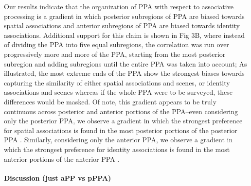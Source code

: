 \documentclass[english]{article}
\begin{document}
%
Our results indicate that the organization of PPA with respect to associative
processing is a gradient in which posterior subregions of PPA are biased towards
spatial associations and anterior subregions of PPA are biased towards identity
associations\citep{aminoff2015associative}.
%
Additional support for this claim is shown in Fig 3B, where instead of dividing
the PPA into five equal subregions, the correlation was run over progressively
more and more of the PPA, starting from the most posterior subregion and adding
subregions until the entire PPA was taken into account\citep{aminoff2015associative};
%
As illustrated, the most extreme ends of the PPA show the strongest biases
towards capturing the similarity of either spatial associations and scenes, or
identity associations and scenes \citep{aminoff2015associative}
%
whereas if the whole PPA were to be surveyed, these differences would be masked.
Of note, this gradient appears to be truly continuous across posterior and
anterior portions of the PPA–even considering only the posterior PPA, we observe
a gradient in which the strongest preference for spatial associations is found
in the most posterior portions of the posterior
PPA \citep{aminoff2015associative}.
%
Similarly, considering only the anterior PPA, we observe a gradient in which the
strongest preference for identity associations is found in the most anterior
portions of the anterior PPA \citep{aminoff2015associative}.


\paragraph{Discussion (just aPP vs pPPA)}
\end{document}
